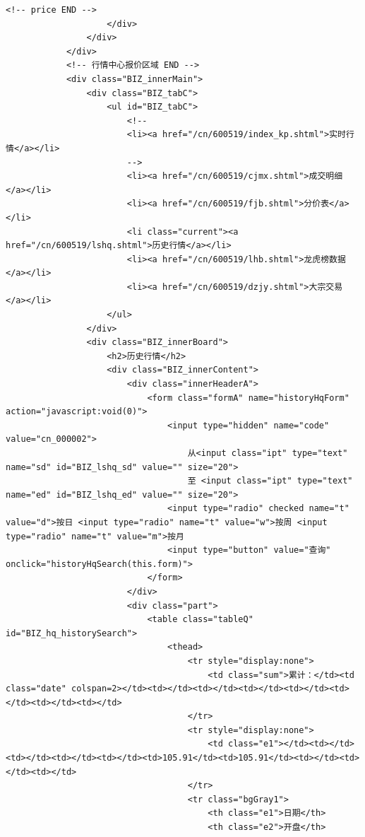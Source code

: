 \documentclass[UTF8,12pt]{article}
\begin{document}
\begin{lstlisting}[title=股票代码300117的界面html源码,frame=shadowbox]
    <!-- price END -->
                    </div>
                </div>
            </div>
            <!-- 行情中心报价区域 END -->
            <div class="BIZ_innerMain">
                <div class="BIZ_tabC">
                    <ul id="BIZ_tabC">
                        <!--
                        <li><a href="/cn/600519/index_kp.shtml">实时行情</a></li>
                        -->
                        <li><a href="/cn/600519/cjmx.shtml">成交明细</a></li>
                        <li><a href="/cn/600519/fjb.shtml">分价表</a></li>
                        <li class="current"><a href="/cn/600519/lshq.shtml">历史行情</a></li>
                        <li><a href="/cn/600519/lhb.shtml">龙虎榜数据</a></li>
                        <li><a href="/cn/600519/dzjy.shtml">大宗交易</a></li>
                    </ul>
                </div>
                <div class="BIZ_innerBoard">
                    <h2>历史行情</h2>
                    <div class="BIZ_innerContent">
                        <div class="innerHeaderA">
                            <form class="formA" name="historyHqForm" action="javascript:void(0)">
                                <input type="hidden" name="code" value="cn_000002">
                                    从<input class="ipt" type="text" name="sd" id="BIZ_lshq_sd" value="" size="20"> 
                                    至 <input class="ipt" type="text" name="ed" id="BIZ_lshq_ed" value="" size="20"> 
                                <input type="radio" checked name="t" value="d">按日 <input type="radio" name="t" value="w">按周 <input type="radio" name="t" value="m">按月 
                                <input type="button" value="查询" onclick="historyHqSearch(this.form)">
                            </form>
                        </div>
                        <div class="part">
                            <table class="tableQ" id="BIZ_hq_historySearch">
                                <thead>
                                    <tr style="display:none">
                                        <td class="sum">累计：</td><td class="date" colspan=2></td><td></td><td></td><td></td><td></td><td></td><td></td><td></td>
                                    </tr>
                                    <tr style="display:none">
                                        <td class="e1"></td><td></td><td></td><td></td><td></td><td>105.91</td><td>105.91</td><td></td><td></td><td></td>
                                    </tr>
                                    <tr class="bgGray1">
                                        <th class="e1">日期</th>
                                        <th class="e2">开盘</th>

\end{lstlisting}
\end{document}
